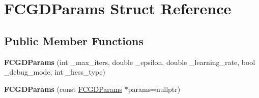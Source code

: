 \hypertarget{structFCGDParams}{\section{F\-C\-G\-D\-Params Struct Reference}
\label{structFCGDParams}
}
\subsection*{Public Member Functions}
\begin{DoxyCompactItemize}
\item 
\hypertarget{structFCGDParams_a8bb7d435695b962f7086a427570061cf}{{\bfseries F\-C\-G\-D\-Params} (int \-\_\-max\-\_\-iters, double \-\_\-epsilon, double \-\_\-learning\-\_\-rate, bool \-\_\-debug\-\_\-mode, int \-\_\-hess\-\_\-type)}\label{structFCGDParams_a8bb7d435695b962f7086a427570061cf}

\item 
\hypertarget{structFCGDParams_abf3c7c463b276314a94d5716d77eca42}{{\bfseries F\-C\-G\-D\-Params} (const \hyperlink{structFCGDParams}{F\-C\-G\-D\-Params} $\ast$params=nullptr)}\label{structFCGDParams_abf3c7c463b276314a94d5716d77eca42}

\end{DoxyCompactItemize}
